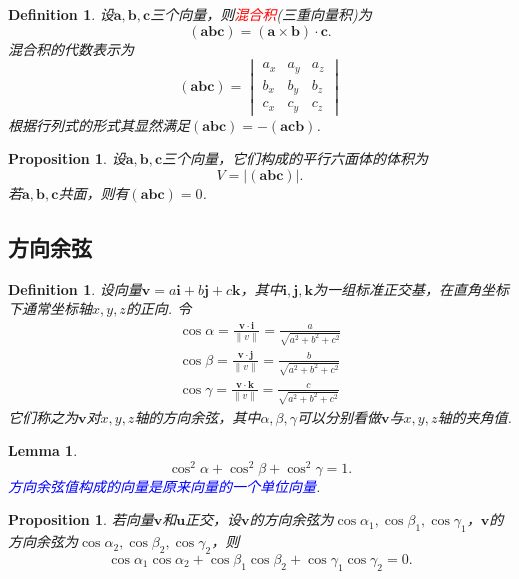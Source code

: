 \documentclass{article}
\newcommand{\mbf}[1]{\bm{#1}}
\newtheorem{lemma}[theorem]{Lemma}
\newtheorem{proposition}[theorem]{Proposition}
\newtheorem{definition}[theorem]{Definition}
\newcommand{\norm}[1]{\left\lVert#1\right\rVert} %
\newcommand{\redt}[1]{\textcolor{red}{#1}}
\newcommand{\bluet}[1]{\textcolor{blue}{#1}}
\begin{document}
\begin{definition}
\rm 设$\mbf{a},\mbf{b},\mbf{c}$三个向量，则\redt{混合积}(三重向量积)为
$$
(\mbf{a}\mbf{b}\mbf{c}) = (\mbf{a} \times \mbf{b}) \cdot \mbf{c}. 
$$
混合积的代数表示为
$$
(\mbf{a}\mbf{b}\mbf{c}) = \begin{vmatrix}
a_x & a_y & a_z \\
b_x & b_y & b_z \\
c_x & c_y & c_z 
\end{vmatrix}
$$
根据行列式的形式其显然满足$(\mbf{a}\mbf{b}\mbf{c}) = -(\mbf{a}\mbf{c}\mbf{b})$. 
\end{definition}

\begin{proposition}
\rm 设$\mbf{a},\mbf{b},\mbf{c}$三个向量，它们构成的平行六面体的体积为
$$
V = |(\mbf{a}\mbf{b}\mbf{c})|.
$$
若$\mbf{a},\mbf{b},\mbf{c}$共面，则有$(\mbf{a}\mbf{b}\mbf{c})=0$.  
\end{proposition}

\subsection{方向余弦}

\begin{definition}
\rm 设向量$\mbf{v} = a\mbf{i} + b\mbf{j} + c\mbf{k}$，其中$\mbf{i},\mbf{j},\mbf{k}$为一组标准正交基，在直角坐标下通常坐标轴$x,y,z$的正向. 令
$$
\begin{aligned}
\cos \alpha = \frac{\mbf{v}\cdot\mbf{i}}{\norm{v}} = \frac{a}{\sqrt{a^2 + b^2 + c^2}}\\
\cos \beta =  \frac{\mbf{v}\cdot\mbf{j}}{\norm{v}} = \frac{b}{\sqrt{a^2 + b^2 + c^2}} \\
\cos \gamma =  \frac{\mbf{v}\cdot\mbf{k}}{\norm{v}} = \frac{c}{\sqrt{a^2 + b^2 + c^2}}
\end{aligned}
$$
它们称之为$\mbf{v}$对$x,y,z$轴的方向余弦，其中$\alpha,\beta,\gamma$可以分别看做$\mbf{v}$与$x,y,z$轴的夹角值. 
\end{definition}

\begin{lemma}
\rm 
$$
\cos^2\alpha + \cos^2\beta + \cos^2\gamma = 1.
$$
\bluet{方向余弦值构成的向量是原来向量的一个单位向量}. 
\end{lemma}

\begin{proposition}
\rm 若向量$\mbf{v}$和$\mbf{u}$正交，设$\mbf{v}$的方向余弦为$\cos \alpha_1, \cos \beta_1, \cos \gamma_1$，$\mbf{v}$的方向余弦为$\cos \alpha_2, \cos \beta_2, \cos \gamma_2$，则
$$
\cos \alpha_1\cos \alpha_2 + \cos \beta_1\cos \beta_2 + \cos \gamma_1\cos \gamma_2 = 0.
$$

\end{proposition}
\end{document}
